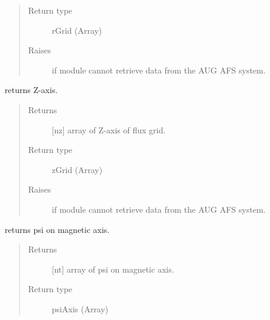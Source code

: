 \documentclass[letterpaper,10pt,english]{sphinxmanual}
\begin{document}
\begin{fulllineitems}
\begin{fulllineitems}
\begin{quote}
\begin{description}
\item[{Return type}] \leavevmode
rGrid (Array)

\item[{Raises}] \leavevmode
{} \textendash{} if module cannot retrieve data from the AUG AFS system.

\end{description}\end{quote}

\end{fulllineitems}


\begin{fulllineitems}
\label{\detokenize{eqtools:eqtools.AUGData.AUGDDData.getZGrid}}
returns Z-axis.
\begin{quote}\begin{description}
\item[{Returns}] \leavevmode
{[}nz{]} array of Z-axis of flux grid.

\item[{Return type}] \leavevmode
zGrid (Array)

\item[{Raises}] \leavevmode
{} \textendash{} if module cannot retrieve data from the AUG AFS system.

\end{description}\end{quote}

\end{fulllineitems}


\begin{fulllineitems}
\label{\detokenize{eqtools:eqtools.AUGData.AUGDDData.getFluxAxis}}
returns psi on magnetic axis.
\begin{quote}\begin{description}
\item[{Returns}] \leavevmode
{[}nt{]} array of psi on magnetic axis.

\item[{Return type}] \leavevmode
psiAxis (Array)


\end{description}
\end{quote}
\end{fulllineitems}
\end{fulllineitems}
\end{document}

